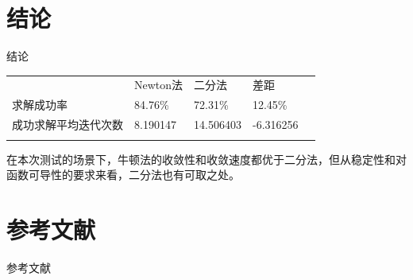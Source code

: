 \documentclass{beamer}
\begin{document}
\section{结论}
\begin{frame}{结论}
    \begin{table}[]
        \begin{tabular}{lllll}
        \cline{1-4}
        \multicolumn{1}{|l|}{}           & \multicolumn{1}{l|}{Newton法}  & \multicolumn{1}{l|}{二分法}       & \multicolumn{1}{l|}{差距}       &  \\ \cline{1-4}
        \multicolumn{1}{|l|}{求解成功率}      & \multicolumn{1}{l|}{84.76\%}  & \multicolumn{1}{l|}{72.31\%}   & \multicolumn{1}{l|}{12.45\%}  &  \\ \cline{1-4}
        \multicolumn{1}{|l|}{成功求解平均迭代次数} & \multicolumn{1}{l|}{8.190147} & \multicolumn{1}{l|}{14.506403} & \multicolumn{1}{l|}{-6.316256} &  \\ \cline{1-4}
                                         &                               &                                &                               & 
        \end{tabular}
    \end{table}

    在本次测试的场景下，牛顿法的收敛性和收敛速度都优于二分法，但从稳定性和对函数可导性的要求来看，二分法也有可取之处。
\end{frame}
\section{参考文献}
\begin{frame}{参考文献}
    
\end{frame}
\end{document}
